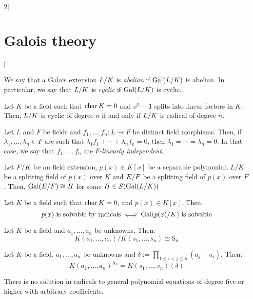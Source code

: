 \documentclass[../../../main.tex]{subfiles}
\begin{document}
\begin{multicols}{2}[\section{Galois theory}]
\begin{prop}
  \end{prop}
  \begin{definition}
    We say that a Galois extension $\quot{L}{K}$ is \emph{abelian} if $\Gal(\quot{L}{K})$ is abelian. In particular, we say that $\quot{L}{K}$ is \emph{cyclic} if $\Gal(\quot{L}{K})$ is cyclic.
  \end{definition}
  \begin{theorem}
    Let $K$ be a field such that $\operatorname{char} K=0$ and $x^n-1$ splits into linear factors in $K$. Then, $\quot{L}{K}$ is cyclic of degree $n$ if and only if $\quot{L}{K}$ is radical of degree $n$.
  \end{theorem}
  \begin{lemma}
    Let $L$ and $F$ be fields and $f_1,\ldots,f_n:L\rightarrow F$ be distinct field morphisms. Then, if $\lambda_1,\ldots,\lambda_n\in F$ are such that $\lambda_1f_1+\cdots+\lambda_nf_n=0$, then $\lambda_1=\cdots=\lambda_n=0$. In that case, we say that $f_1,\ldots,f_n$ are \emph{$F$-linearly independent}.
  \end{lemma}
  \begin{lemma}
    Let $\quot{F}{K}$ be an field extension, $p(x)\in K[x]$ be a separable polynomial, $\quot{L}{K}$ be a splitting field of $p(x)$ over $K$ and $\quot{E}{F}$ be a splitting field of $p(x)$ over $F$. Then, $\Gal(\quot{E}{F})\cong H$ for some $H\in\mathcal{S}(\Gal(\quot{L}{K}))$
  \end{lemma}
  \begin{theorem}
    Let $K$ be a field such that $\operatorname{char} K=0$, and $p(x)\in K[x]$. Then: $$\textstyle p(x)\text{ is solvable by radicals}\iff\Gal(\quot{p(x)}{K})\text{ is solvable}$$
  \end{theorem}
  \begin{lemma}
    Let $K$ be a field and $a_1,\ldots,a_n$ be unknowns. Then: $$K(a_1,\ldots,a_n)/K(s_1,\ldots,s_n)\cong \text{S}_n$$
  \end{lemma}
  \begin{corollary}
    Let $K$ be a field, $a_1,\ldots,a_n$ be unknowns and $\delta:=\prod_{1\leq i<j\leq n}(a_j-a_i)$. Then: $${K(a_1,\ldots,a_n)}^{\text{A}_n}=K(s_1,\ldots,s_n)(\delta)$$
  \end{corollary}
  \begin{theorem}
    There is no solution in radicals to general polynomial equations of degree five or higher with arbitrary coefficients.
  \end{theorem}
  \begin{prop}

\end{prop}
\end{multicols}
\end{document}
